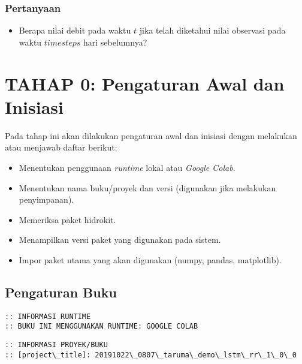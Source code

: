 \documentclass[11pt]{article}
\providecommand{\tightlist}{%
      \setlength{\itemsep}{0pt}\setlength{\parskip}{0pt}}
\let\oldsection\section
\renewcommand\section{\clearpage\oldsection}
\begin{document}
\hypertarget{pertanyaan}{%
\subsubsection{Pertanyaan}\label{pertanyaan}}

\begin{itemize}
\tightlist
\item
  Berapa nilai debit pada waktu \(t\) jika telah diketahui nilai
  observasi pada waktu \(timesteps\) hari sebelumnya?
\end{itemize}

    \hypertarget{tahap-0-pengaturan-awal-dan-inisiasi}{%
\section{TAHAP 0: Pengaturan Awal dan
Inisiasi}\label{tahap-0-pengaturan-awal-dan-inisiasi}}

Pada tahap ini akan dilakukan pengaturan awal dan inisiasi dengan
melakukan atau menjawab daftar berikut:

\begin{itemize}
\tightlist
\item
  Menentukan penggunaan \emph{runtime} lokal atau \emph{Google Colab}.
\item
  Menentukan nama buku/proyek dan versi (digunakan jika melakukan
  penyimpanan).
\item
  Memeriksa paket hidrokit.
\item
  Menampilkan versi paket yang digunakan pada sistem.
\item
  Impor paket utama yang akan digunakan (numpy, pandas, matplotlib).
\end{itemize}

    \hypertarget{pengaturan-buku}{%
\subsection{Pengaturan Buku}\label{pengaturan-buku}}

    \begin{Verbatim}[commandchars=\\\{\}]
:: INFORMASI RUNTIME
:: BUKU INI MENGGUNAKAN RUNTIME: GOOGLE COLAB
    \end{Verbatim}

    \begin{Verbatim}[commandchars=\\\{\}]
:: INFORMASI PROYEK/BUKU
:: [project\_title]: 20191022\_0807\_taruma\_demo\_lstm\_rr\_1\_0\_0
    \end{Verbatim}
\end{document}
